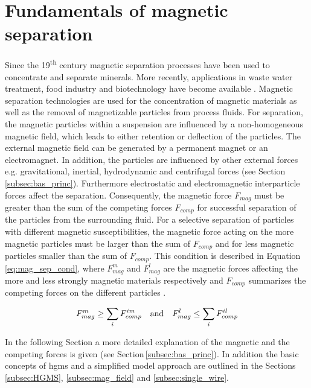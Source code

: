 \section{Fundamentals of magnetic separation}
\label{sec:Mag_sep}
Since the 19\textsuperscript{th} century magnetic separation processes have been used to concentrate and separate minerals. More recently, applications in waste water treatment, food industry and biotechnology have become available \cite{yavuz2009magnetic}. Magnetic separation technologies are used for the concentration of magnetic materials  as well as the removal of magnetizable particles from process fluids. For separation, the magnetic particles within a suspension are influenced by a non-homogeneous magnetic field, which leads to either retention or deflection of the particles. The external magnetic field can be generated by a permanent magnet or an electromagnet. In addition, the particles are influenced by other external forces e.g. gravitational, inertial, hydrodynamic and centrifugal forces (see Section\,\ref{subsec:bas_princ}). Furthermore electrostatic and electromagnetic interparticle forces affect the separation. Consequently, the magnetic force $F_{mag}$ must be greater than the sum of the competing forces $F_{comp}$ for successful separation of the particles from the surrounding fluid. For a selective separation of particles with different magnetic susceptibilities, the magnetic force acting on the more magnetic particles must be larger than the sum of $F_{comp}$ and for less magnetic particles smaller than the sum of $F_{comp}$. This condition is described in Equation\,\ref{eq:mag_sep_cond}, where $F_{mag}^{m}$ and $F_{mag}^{l}$ are the magnetic forces affecting the more and less strongly magnetic materials respectively and $F_{comp}$ summarizes the competing forces on the different particles \cite{svoboda2004magnetic,oberteuffer1974magnetic}.   

\begin{equation}
\label{eq:mag_sep_cond}
\centering
F_{mag}^{m}\geq\sum_{i}F_{comp}^{im} \quad \textrm{and} \quad F_{mag}^{l}\leq\sum_{i}F_{comp}^{il}
\end{equation}

In the following Section a more detailed explanation of the magnetic and the competing forces is given (see Section\,\ref{subsec:bas_princ}). In addition the basic concepts of \gls{hgms} and a simplified model approach are outlined in the Sections\,\ref{subsec:HGMS}, \ref{subsec:mag_field} and \ref{subsec:single_wire}.  

